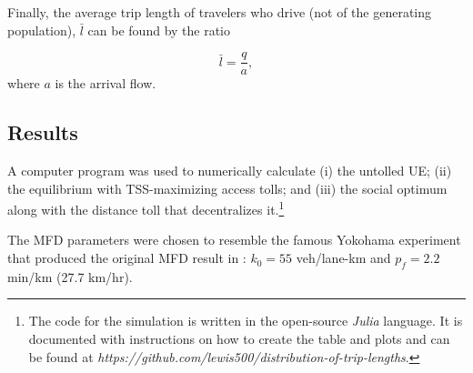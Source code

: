\documentclass[preprint,authoryear]{elsarticle}
\begin{document}
Finally, the average trip length of travelers who drive (not of the generating population), $\bar{l}$ can be found by the ratio

\begin{equation}
	\bar{l} = \frac{q}{a},
\end{equation}
where $a$ is the arrival flow.

\subsection{Results}
\label{ssec:results}

A computer program was used to numerically calculate (i) the untolled UE; (ii) the equilibrium with TSS-maximizing access tolls; and (iii) the social optimum along with the distance toll that decentralizes it.\footnote{The code for the simulation is written in the open-source \emph{Julia} language. It is documented with instructions on how to create the table and plots and can be found at \emph{https://github.com/lewis500/distribution-of-trip-lengths}.}

The MFD parameters were chosen to resemble the famous Yokohama experiment that produced the original MFD result in \citet{Geroliminis2008}: $k_0 = 55$ veh/lane-km and $p_f=2.2$ min/km (27.7 km/hr).
\end{document}
